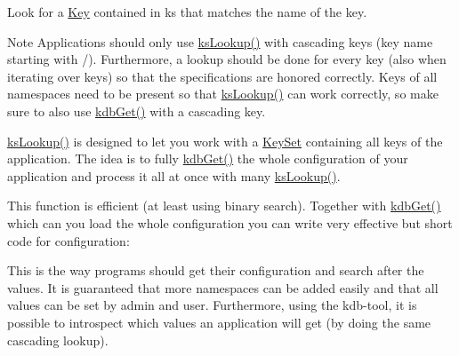 Look for a \mbox{\hyperlink{classkdb_1_1Key}{Key}} contained in {\ttfamily ks} that matches the name of the {\ttfamily key}. 

\begin{DoxyNote}{Note}
Applications should only use \mbox{\hyperlink{group__keyset_gaa34fc43a081e6b01e4120daa6c112004}{ks\+Lookup()}} with cascading keys (key name starting with {\ttfamily /}). Furthermore, a lookup should be done for every key (also when iterating over keys) so that the specifications are honored correctly. Keys of all namespaces need to be present so that \mbox{\hyperlink{group__keyset_gaa34fc43a081e6b01e4120daa6c112004}{ks\+Lookup()}} can work correctly, so make sure to also use \mbox{\hyperlink{group__kdb_ga28e385fd9cb7ccfe0b2f1ed2f62453a1}{kdb\+Get()}} with a cascading key.
\end{DoxyNote}
{\ttfamily \mbox{\hyperlink{group__keyset_gaa34fc43a081e6b01e4120daa6c112004}{ks\+Lookup()}}} is designed to let you work with a \mbox{\hyperlink{classkdb_1_1KeySet}{Key\+Set}} containing all keys of the application. The idea is to fully \mbox{\hyperlink{group__kdb_ga28e385fd9cb7ccfe0b2f1ed2f62453a1}{kdb\+Get()}} the whole configuration of your application and process it all at once with many {\ttfamily \mbox{\hyperlink{group__keyset_gaa34fc43a081e6b01e4120daa6c112004}{ks\+Lookup()}}}.

This function is efficient (at least using binary search). Together with \mbox{\hyperlink{group__kdb_ga28e385fd9cb7ccfe0b2f1ed2f62453a1}{kdb\+Get()}} which can you load the whole configuration you can write very effective but short code for configuration\+:


\begin{DoxyCodeInclude}{0}
\end{DoxyCodeInclude}
 This is the way programs should get their configuration and search after the values. It is guaranteed that more namespaces can be added easily and that all values can be set by admin and user. Furthermore, using the kdb-\/tool, it is possible to introspect which values an application will get (by doing the same cascading lookup).

